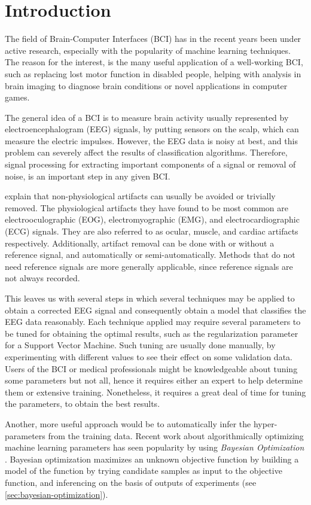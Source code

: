 \section{Introduction}
The field of Brain-Computer Interfaces (BCI) has in the recent years been under active research, especially with the popularity of machine learning techniques. The reason for the interest, is the many useful application of a well-working BCI, such as replacing lost motor function in disabled people, helping with analysis in brain imaging to diagnose brain conditions or novel applications in computer games. 

The general idea of a BCI is to measure brain activity usually represented by electroencephalogram (EEG) signals, by putting sensors on the scalp, which can measure the electric impulses. However, the EEG data is noisy at best, and this problem can severely affect the results of classification algorithms. Therefore, signal processing for extracting important components of a signal or removal of noise, is an important step in any given BCI.

\cite{uriguen2015eeg} explain that non-physiological artifacts can usually be avoided or trivially removed. The physiological artifacts they have found to be most common are electrooculographic (EOG), electromyographic (EMG), and electrocardiographic (ECG) signals. They are also referred to as ocular, muscle, and cardiac artifacts respectively. Additionally, artifact removal can be done with or without a reference signal, and automatically or semi-automatically. Methods that do not need reference signals are more generally applicable, since reference signals are not always recorded.

This leaves us with several steps in which several techniques may be applied to obtain a corrected EEG signal and consequently obtain a model that classifies the EEG data reasonably. Each technique applied may require several parameters to be tuned for obtaining the optimal results, such as the regularization parameter for a Support Vector Machine. Such tuning are usually done manually, by experimenting with different values to see their effect on some validation data. Users of the BCI or medical professionals might be knowledgeable about tuning some parameters but not all, hence it requires either an expert to help determine them or extensive training. Nonetheless, it requires a great deal of time for tuning the parameters, to obtain the best results.

Another, more useful approach would be to automatically infer the hyper-parameters from the training data. Recent work about algorithmically optimizing machine learning parameters has seen popularity by using \emph{Bayesian Optimization} \citep{brochu2010tutorial,snoek2012practical,shahriari2016taking}. Bayesian optimization maximizes an unknown objective function by building a model of the function by trying candidate samples as input to the objective function, and inferencing on the basis of outputs of experiments (see \cref{sec:bayesian-optimization}).

